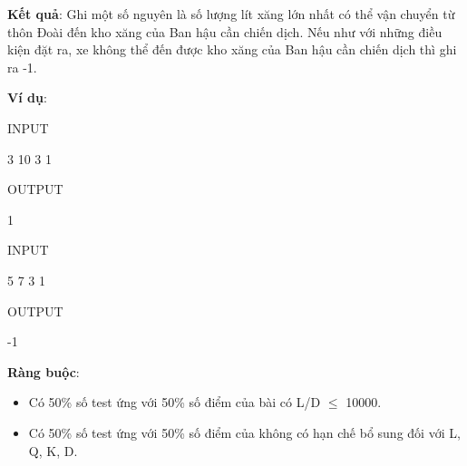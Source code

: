 \textbf{Kết quả}: Ghi một số nguyên là số lượng lít xăng lớn nhất có thể vận chuyển từ thôn Đoài đến kho xăng của Ban hậu cần chiến dịch. Nếu như với những điều kiện đặt ra, xe không thể đến được kho xăng của Ban hậu cần chiến dịch thì ghi ra -1.

\textbf{Ví dụ}:

INPUT

3 10 3 1

OUTPUT

1

INPUT

5 7 3 1

OUTPUT

-1

\textbf{Ràng buộc}:
\begin{itemize}
	\item Có 50\% số test ứng với 50\% số điểm của bài có L/D  $\le$  10000.
	\item Có 50\% số test ứng với 50\% số điểm của không có hạn chế bổ sung đối với L, Q, K, D.
\end{itemize}
